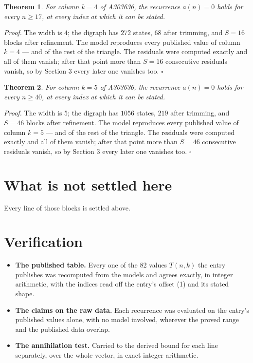 \documentclass[11pt]{article}
\newtheorem{theorem}{Theorem}
\theoremstyle{definition}
\begin{document}
\begin{theorem} For column $k = 4$ of A303636, the recurrence $a(n) = 0$ holds for every $n \ge 17$, at every index at which it can be stated.\end{theorem}

{\itshape Proof.} The width is $4$; the digraph has $272$ states, $68$ after trimming, and $S = 16$ blocks after refinement. The model reproduces every published value of column $k = 4$ --- and of the rest of the triangle. The residuals were computed exactly and all of them vanish; after that point more than $S = 16$ consecutive residuals vanish, so by Section 3 every later one vanishes too. $\square$

\begin{theorem} For column $k = 5$ of A303636, the recurrence $a(n) = 0$ holds for every $n \ge 40$, at every index at which it can be stated.\end{theorem}

{\itshape Proof.} The width is $5$; the digraph has $1056$ states, $219$ after trimming, and $S = 46$ blocks after refinement. The model reproduces every published value of column $k = 5$ --- and of the rest of the triangle. The residuals were computed exactly and all of them vanish; after that point more than $S = 46$ consecutive residuals vanish, so by Section 3 every later one vanishes too. $\square$

\section{What is not settled here}

Every line of those blocks is settled above.

\section{Verification}

\begin{itemize}

\item {\bfseries The published table.} Every one of the 82 values $T(n,k)$ the entry publishes was recomputed from the models and agrees exactly, in integer arithmetic, with the indices read off the entry's offset (1) and its stated shape.

\item {\bfseries The claims on the raw data.} Each recurrence was evaluated on the entry's published values alone, with no model involved, wherever the proved range and the published data overlap.

\item {\bfseries The annihilation test.} Carried to the derived bound for each line separately, over the whole vector, in exact integer arithmetic.

\end{itemize}
\end{document}

